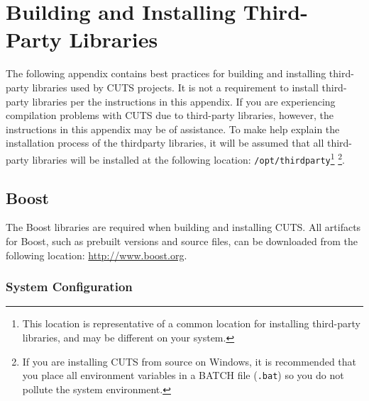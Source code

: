 
\chapter{Building and Installing Third-Party Libraries}
\label{chap:thirdparty}

The following appendix contains best practices for building
and installing third-party libraries used by CUTS projects. It is not
a requirement to install third-party libraries per the instructions in
this appendix. If you are experiencing compilation problems with CUTS
due to third-party libraries, however, the instructions in this appendix
may be of assistance. To make help explain the installation process
of the thirdparty libraries, it will be assumed that all third-party
libraries will be installed at the following location:
\texttt{/opt/thirdparty}\footnote{This location is representative 
of a common location for installing third-party libraries, and may
be different on your system.} \footnote{If you are installing CUTS
from source on Windows, it is recommended that you place all environment
variables in a BATCH file (\texttt{.bat}) so you do not pollute the
system environment.}.

\section{Boost}
\label{sec:thirdparty-boost}

The Boost libraries are required when building and installing CUTS. All
artifacts for Boost, such as prebuilt versions and source files, can be 
downloaded from the following location: \url{http://www.boost.org}. 

\subsection{System Configuration}

